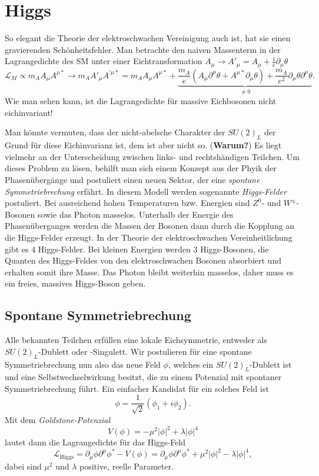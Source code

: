 \chapter{Higgs}
So elegant die Theorie der elektroschwachen Vereinigung auch ist, hat sie einen gravierenden Schönheitsfehler.
Man betrachte den naiven Massenterm in der Lagrangedichte des SM unter einer Eichtransformation $A_\mu \rightarrow A'_\mu = A_\mu + \frac{1}{e}\partial_\mu\theta$
\begin{equation*}
	\mathcal{L}_M \propto m_A A_\mu A^{\mu*}\longrightarrow m_A A'_\mu A^{'\mu*} = m_A A_\mu A^{\mu*} + \underbrace{\frac{m_A}{e}(A_\mu\partial^\mu\theta + A^{\mu*}\partial_\mu\theta) + \frac{m_A}{e^2}\partial_\mu\theta\partial^\mu\theta}_{\neq 0}.
\end{equation*}
Wie man sehen kann, ist die Lagrangedichte für massive Eichbosonen nicht eichinvariant!

Man könnte vermuten, dass der nicht-abelsche Charakter der $SU(2)_L$ der Grund für diese Eichinvarianz ist, dem ist aber nicht so. (\textbf{Warum?}) %
Es liegt vielmehr an der Unterscheidung zwischen links- und rechtshändigen Teilchen.
Um dieses Problem zu lösen, behilft man sich einem Konzept aus der Phyik der Phasenübergänge und postuliert einen neuen Sektor, der eine \textit{spontane Symmetriebrechung} erfährt.
In diesem Modell werden sogenannte \textit{Higgs-Felder} postuliert.
Bei ausreichend hohen Temperaturen bzw. Energien sind $Z^0$- und $W^\pm$-Bosonen sowie das Photon masselos.
Unterhalb der Energie des Phasenüberganges werden die Massen der Bosonen dann durch die Kopplung an die Higgs-Felder erzeugt.
In der Theorie der elektroschwachen Vereinheitlichung gibt es 4 Higgs-Felder.
Bei kleinen Energien werden 3 Higgs-Bosonen, die Quanten des Higgs-Feldes von den elektroschwachen Bosonen absorbiert und erhalten somit ihre Masse.
Das Photon bleibt weiterhin masselos, daher muss es ein freies, massives Higgs-Boson geben.

\section{Spontane Symmetriebrechung}
Alle bekannten Teilchen erfüllen eine lokale Eichsymmetrie, entweder als $SU(2)_L$-Dublett oder -Singulett.
Wir postulieren für eine spontane Symmetriebrechung nun also das neue Feld $\phi$, welches ein $SU(2)_L$-Dublett ist und eine Selbstwechselwirkung besitzt, die zu einem Potenzial mit spontaner Symmetriebrechung führt.
Ein einfacher Kandidat für ein solches Feld ist
\begin{equation*}
	\phi = \frac{1}{\sqrt{2}}(\phi_1+i\phi_2).
\end{equation*}
Mit dem \textit{Goldstone-Potenzial}
\begin{equation*}
	V(\phi) = -\mu^2|\phi|^2 + \lambda|\phi|^4
\end{equation*}
lautet dann die Lagrangedichte für das Higgs-Feld
\begin{equation*}
	\mathcal{L}_\text{Higgs} = \partial_\mu\phi\partial^\mu\phi^* - V(\phi) = \partial_\mu\phi\partial^\mu\phi^* + \mu^2|\phi|^2 - \lambda|\phi|^4,
\end{equation*}
dabei sind $\mu^2$ und $\lambda$ positive, reelle Parameter.

